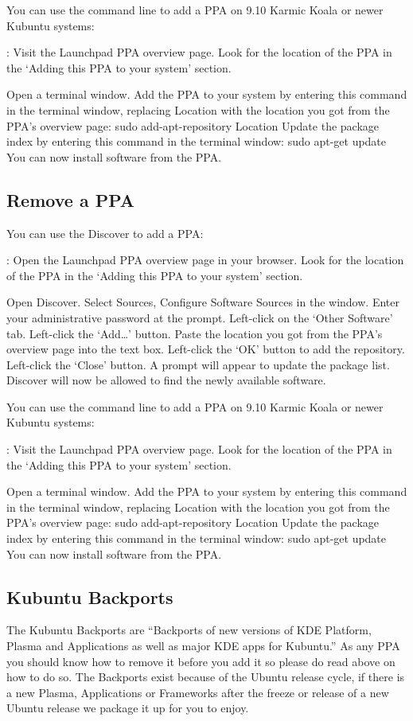 \documentclass[letterpaper,10pt,english]{sphinxmanual}
\begin{document}
You can use the command line to add a PPA on 9.10 Karmic Koala or newer Kubuntu systems:

: Visit the Launchpad PPA overview page. Look for the location of the PPA in the ‘Adding this PPA to your system’ section.

Open a terminal window. Add the PPA to your system by entering this command in the terminal window, replacing Location with the location you got from the PPA’s overview page: sudo add-apt-repository Location Update the package index by entering this command in the terminal window: sudo apt-get update You can now install software from the PPA.


\subsection{Remove a PPA}
\label{\detokenize{docs/repositories:remove-a-ppa}}
You can use the Discover to add a PPA:

: Open the Launchpad PPA overview page in your browser. Look for the location of the PPA in the ‘Adding this PPA to your system’ section.

Open Discover. Select Sources, Configure Software Sources in the window. Enter your administrative password at the prompt. Left-click on the ‘Other Software’ tab. Left-click the ‘Add…’ button. Paste the location you got from the PPA’s overview page into the text box. Left-click the ‘OK’ button to add the repository. Left-click the ‘Close’ button. A prompt will appear to update the package list. Discover will now be allowed to find the newly available software.

You can use the command line to add a PPA on 9.10 Karmic Koala or newer Kubuntu systems:

: Visit the Launchpad PPA overview page. Look for the location of the PPA in the ‘Adding this PPA to your system’ section.

Open a terminal window. Add the PPA to your system by entering this command in the terminal window, replacing Location with the location you got from the PPA’s overview page: sudo add-apt-repository Location Update the package index by entering this command in the terminal window: sudo apt-get update You can now install software from the PPA.


\subsection{Kubuntu Backports}
\label{\detokenize{docs/repositories:kubuntu-backports}}
The Kubuntu Backports are “Backports of new versions of KDE Platform, Plasma and Applications as well as major KDE apps for Kubuntu.” As any PPA you should know how to remove it before you add it so please do read above on how to do so. The Backports exist because of the Ubuntu release cycle, if there is a new Plasma, Applications or Frameworks after the freeze or release of a new Ubuntu release we package it up for you to enjoy.
\end{document}
